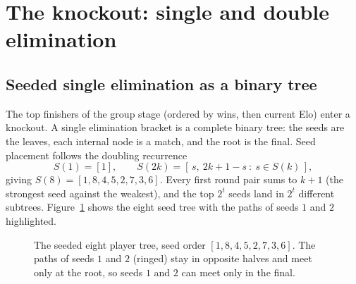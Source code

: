\documentclass[11pt]{article}
\begin{document}
\section{The knockout: single and double elimination}

\subsection{Seeded single elimination as a binary tree}

The top finishers of the group stage (ordered by wins, then current Elo) enter a
knockout. A single elimination bracket is a complete binary tree: the seeds are the
leaves, each internal node is a match, and the root is the final. Seed placement
follows the doubling recurrence
\[
S(1) = [1], \qquad S(2k) = [\,s,\ 2k+1-s \ :\ s \in S(k)\,],
\]
giving $S(8) = [1,8,4,5,2,7,3,6]$. Every first round pair sums to $k+1$ (the
strongest seed against the weakest), and the top $2^t$ seeds land in $2^t$
different subtrees. Figure~\ref{fig:tree} shows the eight seed tree with the paths
of seeds $1$ and $2$ highlighted.

\begin{figure}[h]
\centering
{}
\caption{The seeded eight player tree, seed order $[1,8,4,5,2,7,3,6]$. The paths of
seeds $1$ and $2$ (ringed) stay in opposite halves and meet only at the root, so
seeds $1$ and $2$ can meet only in the final.}
\label{fig:tree}
\end{figure}
\end{document}
